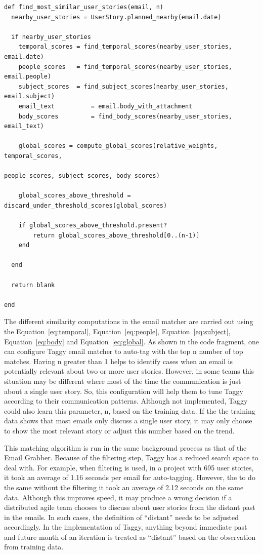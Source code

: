 \pagebreak              
\begin{verbatim}
def	find_most_similar_user_stories(email, n)
  nearby_user_stories = UserStory.planned_nearby(email.date)

  if nearby_user_stories
    temporal_scores = find_temporal_scores(nearby_user_stories, email.date)
    people_scores 	= find_temporal_scores(nearby_user_stories, email.people)
    subject_scores 	= find_subject_scores(nearby_user_stories, email.subject)
    email_text 			= email.body_with_attachment
    body_scores 		= find_body_scores(nearby_user_stories, email_text)

    global_scores = compute_global_scores(relative_weights, temporal_scores, 
																people_scores, subject_scores, body_scores)

    global_scores_above_threshold =  discard_under_threshold_scores(global_scores)

    if global_scores_above_threshold.present?
    	return global_scores_above_threshold[0..(n-1)]
    end
		
  end
	
  return blank
	
end
\end{verbatim}

The different similarity computations in the email matcher are carried out using the Equation~\ref{eq:temporal}, Equation~\ref{eq:people}, Equation~\ref{eq:subject}, Equation~\ref{eq:body} and Equation~\ref{eq:global}. As shown in the code fragment, one can configure Taggy email matcher to auto-tag with the top n number of top matches. Having n greater than 1 helps to identify cases when an email is potentially relevant about two or more user stories. However, in some teams this situation may be different where most of the time the communication is just about a single user story. So, this configuration will help them to tune Taggy according to their communication patterns. Although not implemented, Taggy could also learn this parameter, n, based on the training data. If the the training data shows that most emails only discuss a single user story, it may only choose to show the most relevant story or adjust this number based on the trend.

This matching algorithm is run in the same background process as that of the Email Grabber. Because of the filtering step, Taggy has a reduced search space to deal with. For example, when filtering is used, in a project with 695 user stories, it took an average of 1.16 seconds per email for auto-tagging. However, the to do the same without the filtering it took an average of 2.12 seconds on the same data. Although this improves speed, it may produce a wrong decision if a distributed agile team chooses to discuss about user stories from the distant past in the emails. In such cases, the definition of ``distant'' needs to be adjusted accordingly. In the implementation of Taggy, anything beyond immediate past and future month of an iteration is treated as ``distant'' based on the observation from training data.

